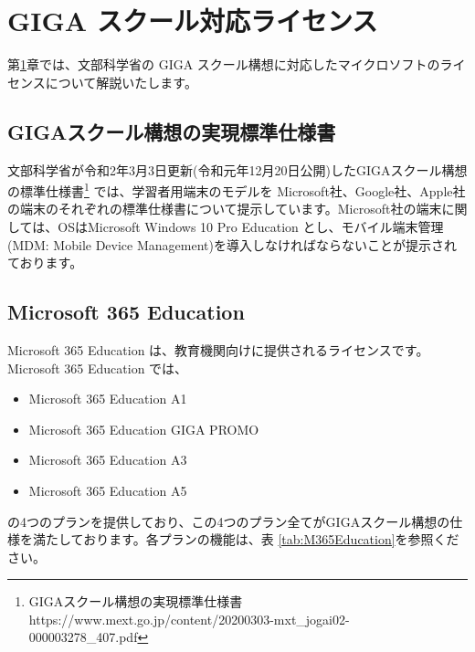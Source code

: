 \chapter{GIGA スクール対応ライセンス}\label{sec:ライセンス}

第\ref{sec:ライセンス}章では、文部科学省の GIGA スクール構想に対応したマイクロソフトのライセンスについて解説いたします。

\section{GIGAスクール構想の実現標準仕様書}

文部科学省が令和2年3月3日更新(令和元年12月20日公開)したGIGAスクール構想の標準仕様書\footnote{GIGAスクール構想の実現標準仕様書 https:\slash\slash www.mext.go.jp\slash content\slash 20200303-mxt\_jogai02-000003278\_407.pdf} では、学習者用端末のモデルを Microsoft社、Google社、Apple社の端末のそれぞれの標準仕様書について提示しています。Microsoft社の端末に関しては、OSはMicrosoft Windows 10 Pro Education とし、モバイル端末管理(MDM: Mobile Device Management)を導入しなければならないことが提示されております。

\section{Microsoft 365 Education}

Microsoft 365 Education は、教育機関向けに提供されるライセンスです。Microsoft 365 Education では、
\begin{itemize}
    \item Microsoft 365 Education A1
    \item Microsoft 365 Education GIGA PROMO
    \item Microsoft 365 Education A3
    \item Microsoft 365 Education A5
\end{itemize}
の4つのプランを提供しており、この4つのプラン全てがGIGAスクール構想の仕様を満たしております。各プランの機能は、表 \ref{tab:M365Education}を参照ください。


